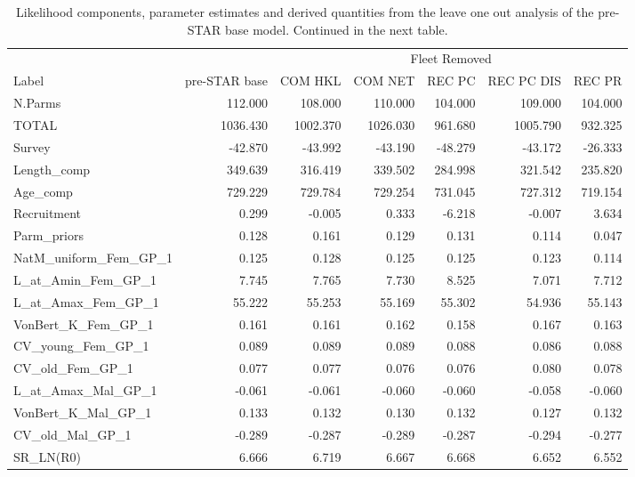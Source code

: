 \documentclass[
  english,
  a4paper,
]{article}
\begin{document}
\FloatBarrier

\begin{landscape}\begin{table}

\caption{\label{tab:drop-one}Likelihood components, parameter estimates and derived quantities from the leave one out analysis of the pre-STAR base model. Continued in the next table.}
\centering
\begin{tabular}[t]{lrrrrrr}
\toprule
\multicolumn{2}{c}{ } & \multicolumn{5}{c}{Fleet Removed} \\
\cmidrule(l{3pt}r{3pt}){3-7}
Label & pre-STAR base & COM HKL & COM NET & REC PC & REC PC DIS & REC PR\\
\midrule
N.Parms & 112.000 & 108.000 & 110.000 & 104.000 & 109.000 & 104.000\\
TOTAL & 1036.430 & 1002.370 & 1026.030 & 961.680 & 1005.790 & 932.325\\
Survey & -42.870 & -43.992 & -43.190 & -48.279 & -43.172 & -26.333\\
Length\_comp & 349.639 & 316.419 & 339.502 & 284.998 & 321.542 & 235.820\\
Age\_comp & 729.229 & 729.784 & 729.254 & 731.045 & 727.312 & 719.154\\
Recruitment & 0.299 & -0.005 & 0.333 & -6.218 & -0.007 & 3.634\\
Parm\_priors & 0.128 & 0.161 & 0.129 & 0.131 & 0.114 & 0.047\\
NatM\_uniform\_Fem\_GP\_1 & 0.125 & 0.128 & 0.125 & 0.125 & 0.123 & 0.114\\
L\_at\_Amin\_Fem\_GP\_1 & 7.745 & 7.765 & 7.730 & 8.525 & 7.071 & 7.712\\
L\_at\_Amax\_Fem\_GP\_1 & 55.222 & 55.253 & 55.169 & 55.302 & 54.936 & 55.143\\
VonBert\_K\_Fem\_GP\_1 & 0.161 & 0.161 & 0.162 & 0.158 & 0.167 & 0.163\\
CV\_young\_Fem\_GP\_1 & 0.089 & 0.089 & 0.089 & 0.088 & 0.086 & 0.088\\
CV\_old\_Fem\_GP\_1 & 0.077 & 0.077 & 0.076 & 0.076 & 0.080 & 0.078\\
L\_at\_Amax\_Mal\_GP\_1 & -0.061 & -0.061 & -0.060 & -0.060 & -0.058 & -0.060\\
VonBert\_K\_Mal\_GP\_1 & 0.133 & 0.132 & 0.130 & 0.132 & 0.127 & 0.132\\
CV\_old\_Mal\_GP\_1 & -0.289 & -0.287 & -0.289 & -0.287 & -0.294 & -0.277\\
SR\_LN(R0) & 6.666 & 6.719 & 6.667 & 6.668 & 6.652 & 6.552\\

\end{tabular}
\end{table}
\end{landscape}
\end{document}
